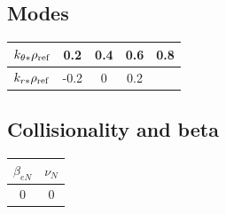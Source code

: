 \documentclass[fleqn]{report}
\begin{document}
\subsection{Modes}
\begin{tabular}{c c c c c}
\hline
$k_{\theta*}\rho_{\textrm{ref}}$ & 0.2 & 0.4 & 0.6 & 0.8 \\ [0.5ex]
\hline
$k_{r*}\rho_{\textrm{ref}}$ & -0.2 & 0  & 0.2  &  \\ [0.5ex]
\hline
\end{tabular}

\subsection{Collisionality and beta}
\begin{tabular}{c c}
\hline
 $\beta_{eN}$ & $\nu_N$ \\ [0.5ex]
\hline
0 & 0 \\ [0.5ex]
\hline
\end{tabular}



\end{document}
